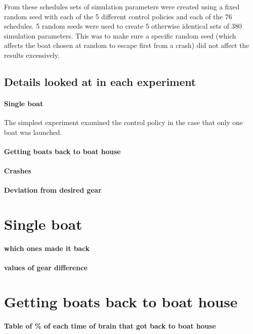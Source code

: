   From these schedules sets of simulation parameters were created using a fixed random seed with each of the 5 different control policies and each of the 76 schedules. 5 random seeds were used to create 5 otherwise identical sets of 380 simulation parameters. This was to make sure a specific random seed (which affects the boat chosen at random to escape first from a crash) did not affect the results excessively.
  
  \subsection{Details looked at in each experiment}
    \paragraph{Single boat}
    The simplest experiment examined the control policy in the case that only one boat was launched.
  
    \paragraph{Getting boats back to boat house}
    
    \paragraph{Crashes}
    
    \paragraph{Deviation from desired gear}

\section{Single boat}
  \paragraph{which ones made it back}
  \paragraph{values of gear difference}
    
\section{Getting boats back to boat house}
  \paragraph{Table of \% of each time of brain that got back to boat house}
  
